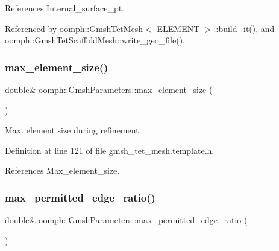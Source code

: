 References Internal\+\_\+surface\+\_\+pt.



Referenced by oomph\+::\+Gmsh\+Tet\+Mesh$<$ E\+L\+E\+M\+E\+N\+T $>$\+::build\+\_\+it(), and oomph\+::\+Gmsh\+Tet\+Scaffold\+Mesh\+::write\+\_\+geo\+\_\+file().

\mbox{\label{classoomph_1_1GmshParameters_afd08195fd9f804b7ced23728b6a63e15}} 
\subsubsection{\texorpdfstring{max\+\_\+element\+\_\+size()}{max\_element\_size()}}
{\footnotesize\ttfamily double\& oomph\+::\+Gmsh\+Parameters\+::max\+\_\+element\+\_\+size (\begin{DoxyParamCaption}{ }\end{DoxyParamCaption})\hspace{0.3cm}{\ttfamily [inline]}}



Max. element size during refinement. 



Definition at line 121 of file gmsh\+\_\+tet\+\_\+mesh.\+template.\+h.



References Max\+\_\+element\+\_\+size.

\mbox{\label{classoomph_1_1GmshParameters_afe2deda55a1eb76d4f782aab9a58089c}} 
\subsubsection{\texorpdfstring{max\+\_\+permitted\+\_\+edge\+\_\+ratio()}{max\_permitted\_edge\_ratio()}}
{\footnotesize\ttfamily double\& oomph\+::\+Gmsh\+Parameters\+::max\+\_\+permitted\+\_\+edge\+\_\+ratio (\begin{DoxyParamCaption}{ }\end{DoxyParamCaption})\hspace{0.3cm}{\ttfamily [inline]}}



